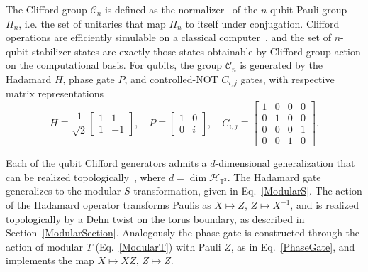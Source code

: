 \documentclass[12pt,a4paper]{article}
\begin{document}
The Clifford group $\mathcal{C}_n$ is defined as the normalizer~\cite{NielsenChuang2010} of the $n$-qubit Pauli group $\Pi_n$, i.e. the set of unitaries that map $\Pi_n$ to itself under conjugation. Clifford operations are efficiently simulable on a classical computer~\cite{aaronson2004improved,Gottesman1997,Gottesman1998}, and the set of $n$-qubit stabilizer states are exactly those states obtainable by Clifford group action on the computational basis. For qubits, the group $\mathcal{C}_n$ is generated by the Hadamard $H$, phase gate $P$, and controlled-NOT $C_{i,j}$ gates, with respective matrix representations
%
\begin{equation}\label{CliffordGates}
    H\equiv \frac{1}{\sqrt{2}}\begin{bmatrix}1&1\\1&-1\end{bmatrix}, \quad P\equiv \begin{bmatrix}1&0\\0&i\end{bmatrix}, \quad C_{i,j} \equiv \begin{bmatrix}1 & 0 & 0 & 0\\0 & 1 & 0 & 0\\0 & 0 & 0 & 1\\0 & 0 & 1 & 0\end{bmatrix}.
\end{equation}

Each of the qubit Clifford generators admits a $d$-dimensional generalization that can be realized topologically~\cite{Gross2006,Hostens2005}, where $d = \dim\mathcal{H}_{\mathbb{T}^2}$. The Hadamard gate generalizes to the modular $S$ transformation, given in Eq.\ \eqref{ModularS}. The action of the Hadamard operator transforms Paulis as $X \mapsto Z$, $Z \mapsto X^{-1}$, and is realized topologically by a Dehn twist on the torus boundary, as described in Section~\ref{ModularSection}. Analogously the phase gate is constructed through the action of modular $T$ (Eq.\ \eqref{ModularT}) with Pauli $Z$, as in Eq.\ \eqref{PhaseGate}, and implements the map $X \mapsto XZ$, $Z \mapsto Z$.
\end{document}
